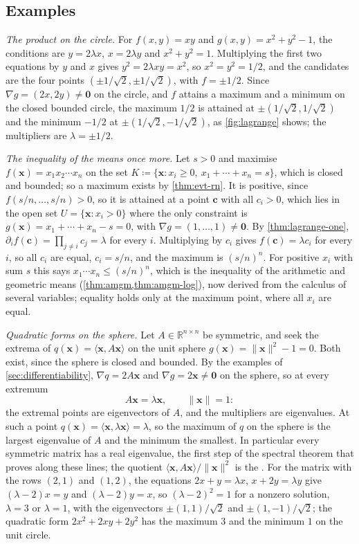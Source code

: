 \subsection{Examples}

\emph{The product on the circle.} For $f(x,y)=xy$ and $g(x,y)=x^2+y^2-1$, the conditions are $y=2\lambda x$, $x=2\lambda y$ and $x^2+y^2=1$. Multiplying the first two equations by $y$ and $x$ gives $y^2=2\lambda xy=x^2$, so $x^2=y^2=1/2$, and the candidates are the four points $(\pm1/\sqrt2,\pm1/\sqrt2)$, with $f=\pm1/2$. Since $\nabla g=(2x,2y)\ne\mathbf0$ on the circle, and $f$ attains a maximum and a minimum on the closed bounded circle, the maximum $1/2$ is attained at $\pm(1/\sqrt2,1/\sqrt2)$ and the minimum $-1/2$ at $\pm(1/\sqrt2,-1/\sqrt2)$, as \cref{fig:lagrange} shows; the multipliers are $\lambda=\pm1/2$.

\emph{The inequality of the means once more.} Let $s>0$ and maximise $f(\mathbf x)=x_1x_2\cdots x_n$ on the set $K\coloneqq\{\mathbf x: x_i\ge0,\ x_1+\cdots+x_n=s\}$, which is closed and bounded; so a maximum exists by \cref{thm:evt-rn}. It is positive, since $f(s/n,\ldots,s/n)>0$, so it is attained at a point $\mathbf c$ with all $c_i>0$, which lies in the open set $U=\{\mathbf x: x_i>0\}$ where the only constraint is $g(\mathbf x)=x_1+\cdots+x_n-s=0$, with $\nabla g=(1,\ldots,1)\ne\mathbf0$. By \cref{thm:lagrange-one}, $\partial_if(\mathbf c)=\prod_{j\ne i}c_j=\lambda$ for every $i$. Multiplying by $c_i$ gives $f(\mathbf c)=\lambda c_i$ for every $i$, so all $c_i$ are equal, $c_i=s/n$, and the maximum is $(s/n)^n$. For positive $x_i$ with sum $s$ this says $x_1\cdots x_n\le(s/n)^n$, which is the inequality of the arithmetic and geometric means (\cref{thm:amgm,thm:amgm-log}), now derived from the calculus of several variables; equality holds only at the maximum point, where all $x_i$ are equal.

\emph{Quadratic forms on the sphere.} Let $A\in\mathbb R^{n\times n}$ be symmetric, and seek the extrema of $q(\mathbf x)=\langle\mathbf x,A\mathbf x\rangle$ on the unit sphere $g(\mathbf x)=\|\mathbf x\|^2-1=0$. Both exist, since the sphere is closed and bounded. By the examples of \cref{sec:differentiability}, $\nabla q=2A\mathbf x$ and $\nabla g=2\mathbf x\ne\mathbf0$ on the sphere, so at every extremum
\[
A\mathbf x=\lambda\mathbf x,\qquad\|\mathbf x\|=1 :
\]
the extremal points are eigenvectors of $A$, and the multipliers are eigenvalues. At such a point $q(\mathbf x)=\langle\mathbf x,\lambda\mathbf x\rangle=\lambda$, so the maximum of $q$ on the sphere is the largest eigenvalue of $A$ and the minimum the smallest. In particular every symmetric matrix has a real eigenvalue, the first step of the spectral theorem that  proves along these lines; the quotient $\langle\mathbf x,A\mathbf x\rangle/\|\mathbf x\|^2$ is the . For the matrix with the rows $(2,1)$ and $(1,2)$, the equations $2x+y=\lambda x$, $x+2y=\lambda y$ give $(\lambda-2)x=y$ and $(\lambda-2)y=x$, so $(\lambda-2)^2=1$ for a nonzero solution, $\lambda=3$ or $\lambda=1$, with the eigenvectors $\pm(1,1)/\sqrt2$ and $\pm(1,-1)/\sqrt2$; the quadratic form $2x^2+2xy+2y^2$ has the maximum $3$ and the minimum $1$ on the unit circle.

